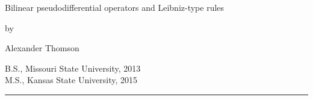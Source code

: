 \begin{center}

   \vspace{1cm}


   \large Bilinear pseudodifferential operators and Leibniz-type rules\\

   \vspace{0.5cm}

   by\\

   \vspace{0.5cm}


   \large Alexander Thomson\\

   \vspace{0.5cm}


  B.S., Missouri State University, 2013 \\
  M.S., Kansas State University, 2015\\

   \vspace{0.55cm}
   \rule{2in}{0.5pt}\\
   \vspace{0.75cm}


\end{center}
